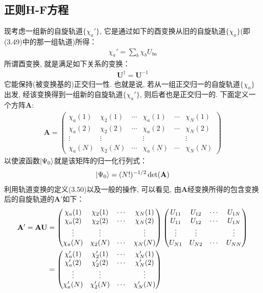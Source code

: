 \subsection{正则H-F方程}
现考虑一组新的自旋轨道$\{\chi_a'\}$, 
它是通过如下的酉变换从旧的自旋轨道$\{\chi_a\}$(即(3.49)中的那一组轨道)所得：
\begin{align}
	\chi_a' = \sum_b\chi_bU_{ba}
\end{align}
所谓酉变换, 
就是满足如下关系的变换：
\begin{align}
	\mathbf{U}^\dagger = \mathbf{U}^{-1}
\end{align}
它能保持(被变换基的)正交归一性. 
也就是说, 
若从一组正交归一的自旋轨道$\{\chi_a\}$出发, 
经该变换得到一组新的自旋轨道$\{\chi_a'\}$, 
则后者也是正交归一的. 
下面定义一个方阵$\mathbf{A}$:
\begin{align}
	\mathbf{A} = 
	\begin{pmatrix}
		\chi_a(1) & \chi_2(1) & \cdots & \chi_a(1) & \cdots & \chi_N(1) \\
		\chi_a(2) & \chi_2(2) & \cdots & \chi_a(2) & \cdots & \chi_N(2) \\
		\vdots    & \vdots    &        & \vdots    &        & \vdots    \\
		\chi_a(N) & \chi_2(N) & \cdots & \chi_a(N) & \cdots & \chi_N(N)
	\end{pmatrix}
\end{align}
以使波函数$\Ket{\Psi_0}$就是该矩阵的归一化行列式：
\begin{align}
	\Ket{\Psi_0} = (N!)^{-1/2}\det(\mathbf{A})
\end{align}
利用轨道变换的定义(3.50)以及一般的操作, 
可以看见, 
由$\mathbf{A}$经变换所得的包含变换后的自旋轨道的$\mathbf{A}'$如下：
\begin{align}
	\mathbf{A}'  = \mathbf{AU} & = 
	\begin{pmatrix}
		\chi_a(1) & \chi_2(1) & \cdots & \chi_N(1) \\
		\chi_a(2) & \chi_2(2) & \cdots & \chi_N(2) \\
		\vdots    & \vdots    &        & \vdots    \\
		\chi_a(N) & \chi_2(N) & \cdots & \chi_N(N)
	\end{pmatrix}
	\begin{pmatrix}
		U_{11} & U_{12} & \cdots & U_{1N} \\
		U_{11} & U_{12} & \cdots & U_{1N} \\
		\vdots & \vdots &        & \vdots \\
		U_{N1} & U_{N2} & \cdots & U_{NN}
	\end{pmatrix} \notag\\
	& = \begin{pmatrix}
		\chi_a'(1) & \chi_2'(1) & \cdots & \chi_N'(1) \\
		\chi_a'(2) & \chi_2'(2) & \cdots & \chi_N'(2) \\
		\vdots     & \vdots     &        & \vdots     \\
		\chi_a'(N) & \chi_2'(N) & \cdots & \chi_N'(N)
	\end{pmatrix}
\end{align}
